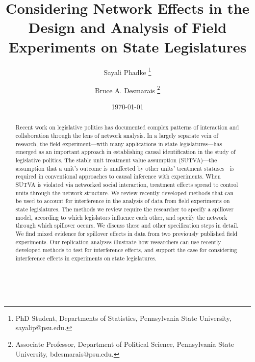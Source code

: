 \documentclass[12pt]{article}
\title{\vspace{-2cm} Considering Network Effects in the Design and Analysis of Field Experiments on State Legislatures }
\author{Sayali Phadke \thanks{\footnotesize{PhD Student, Departments of Statistics, Pennsylvania State University, sayalip@psu.edu.}} \and Bruce A. Desmarais \thanks{\footnotesize{Associate Professor, Department of Political Science, Pennsylvania State University, bdesmarais@psu.edu.}}} \date{\today}
\begin{document}
\maketitle




\begin{abstract} 
\vspace{.3cm}
\vspace{.3cm}

\noindent  Recent work on legislative politics has documented complex patterns of interaction and collaboration through the lens of network analysis. In a largely separate vein of research, the field experiment---with many applications in state legislatures---has emerged as an important approach in establishing causal identification in the study of legislative politics. The stable unit treatment value assumption (SUTVA)---the assumption that a unit's outcome is unaffected by other units' treatment statuses---is required in conventional approaches to causal inference with experiments. When SUTVA is violated via networked social interaction, treatment effects spread to control units through the network structure. We review recently developed methods that can be used to account for interference in the analysis of data from field experiments on state legislatures. The methods we review require the researcher to specify a spillover model, according to which legislators influence each other, and specify the network through which spillover occurs. We discuss these and other specification steps in detail. We find mixed evidence for spillover effects in data from two previously published field experiments. Our replication analyses illustrate how researchers can use recently developed methods to test for interference effects, and support the case for considering interference effects in experiments on state legislatures. %
\\~\\~\\
\end{abstract}
\end{document}
